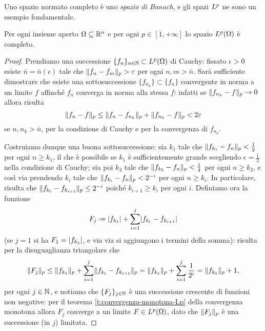 Uno spazio normato completo è uno \emph{spazio di Banach}, e gli spazi $\lclass[p]$ ne sono un esempio fondamentale.
\begin{teorema} \label{t:riesz-fischer}
    Per ogni insieme aperto $\Omega\subseteq\R^n$ e per ogni $p\in[1,+\infty]$ lo spazio $\leb[p]{\Omega}$ è completo.
\end{teorema}
\begin{proof}
    Prendiamo una successione $\{f_n\}_{n\in\N}\subset\leb[p]{\Omega}$ di Cauchy: fissato $\epsilon>0$ esiste $\bar{n}=\bar{n}(\epsilon)$ tale che $\norm{f_n-f_m}_p>\epsilon$ per ogni $n,m>\bar{n}$.
    Sarà sufficiente dimostrare che esiste una sottosuccessione $\{f_{n_k}\}\subset\{f_n\}$ convergente in norma a un limite $f$ affinch\'e $f_n$ converga in norma alla stessa $f$: infatti se $\norm{f_{n_k}-f}_p\to 0$ allora risulta
    \begin{equation}
        \norm{f_n-f}_p \le \norm{f_n-f_{n_k}}_p+\norm{f_{n_k}-f}_p<2\epsilon
    \end{equation}
    se $n,n_k>\bar{n}$, per la condizione di Cauchy e per la convergenza di $f_{n_k}$.

    Costruiamo dunque una buona sottosuccessione: sia $k_1$ tale che $\norm{f_{k_1}-f_n}_p<\frac12$ per ogni $n\ge k_1$, il che è possibile se $k_1$ è sufficientemente grande scegliendo $\epsilon=\frac12$ nella condizione di Cauchy; sia poi $k_2$ tale che $\norm{f_{k_2}-f_n}_p<\frac14$ per ogni $n\ge k_2$, e cos\`i via prendendo $k_i$ tale che $\norm{f_{k_i}-f_n}_p<2^{-i}$ per ogni $n\ge k_i$.
    In particolare, risulta che $\norm{f_{k_i}-f_{k_{i+1}}}_p\le 2^{-i}$ poich\'e $k_{i+1}\ge k_i$ per ogni $i$.
    Definiamo ora la funzione
    \begin{equation}
        F_j\defeq\abs{f_{k_1}}+\sum_{i=1}^j\abs{f_{k_i}-f_{k_{i+1}}}
    \end{equation}
    (se $j=1$ si ha $F_1=\abs{f_{k_1}}$, e via via si aggiungono i termini della somma): risulta per la disuguaglianza triangolare che
    \begin{equation}
        \norm{F_j}_p \le \norm{f_{k_1}}_p+\sum_{i=1}^j\norm{f_{k_i}-f_{k_{i+1}}}_p = \norm{f_{k_1}}_p+\sum_{i=1}^j\frac1{2^i} = \norm{f_{k_1}}_p+1,
    \end{equation}
    per ogni $j\in\N$, e notiamo che $\{F_j\}_{j\in\N}$ è una successione crescente di funzioni non negative: per il teorema \ref{t:convergenza-monotona-Lp} della convergenza monotona allora $F_j$ converge a un limite $F\in\leb[p]{\Omega}$, dato che $\norm{F_j}_p$ è una successione (in $j$) limitata.
    

\end{proof}
